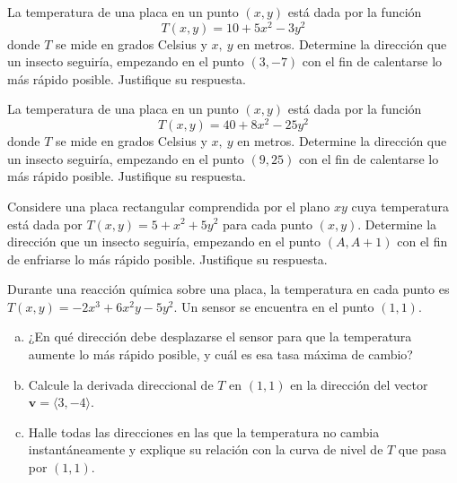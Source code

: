 \begin{prob}
La temperatura de una placa en un punto $(x,y)$ está dada por la función $$T(x,y)=10+5x^2-3y^2$$ donde $T$ se mide en grados Celsius y $x,\ y$ en metros.  Determine la dirección que un insecto seguiría, empezando en el punto $(3,-7)$ con el fin de calentarse lo más rápido posible. Justifique su respuesta.
\end{prob}

\begin{prob}
La temperatura de una placa en un punto $(x,y)$ está dada por la función $$T(x,y)=40+8x^2-25y^2$$ donde $T$ se mide en grados Celsius y $x,\ y$ en metros.  Determine la dirección que un insecto seguiría, empezando en el punto $(9,25)$ con el fin de calentarse lo más rápido posible. Justifique su respuesta.
\end{prob}

\begin{prob}
Considere una placa rectangular comprendida por el plano $xy$ cuya temperatura está dada por $T(x,y)=5+x^{2}+5y^{2}$ para cada punto $(x,y).$ Determine la dirección que un insecto seguiría, empezando en el punto $(A,A+1)$ con el fin de enfriarse lo más rápido posible. Justifique su respuesta.
\end{prob}

\begin{prob}
Durante una reacción química sobre una placa, la temperatura en cada punto es $T(x,y)=-2x^3+6x^2y-5y^2.$ Un sensor se encuentra en el punto $(1,1).$
\begin{enumerate}[a)]
    \item ¿En qué dirección debe desplazarse el sensor para que la temperatura aumente lo más rápido posible, y cuál es esa tasa máxima de cambio?
    \item Calcule la derivada direccional de $T$ en $(1,1)$ en la dirección del vector $\mathbf{v}=\langle 3,-4\rangle.$
    \item Halle todas las direcciones en las que la temperatura no cambia instantáneamente y explique su relación con la curva de nivel de $T$ que pasa por $(1,1).$
\end{enumerate}
\end{prob}

